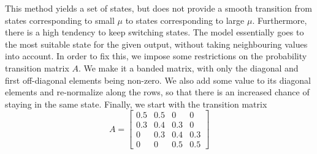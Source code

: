 \documentclass[11pt, twoside]{article}
\begin{document}
This method yields a set of states, but does not provide a smooth transition from states corresponding to small $\mu$ to states corresponding to large $\mu$. Furthermore, there is a high tendency to keep switching states. The model essentially goes to the most suitable state for the given output, without taking neighbouring values into account. In order to fix this, we impose some restrictions on the probability transition matrix $A$. We make it a banded matrix, with only the diagonal and first off-diagonal elements being non-zero. We also add some value to its diagonal elements and re-normalize along the rows, so that there is an increased chance of staying in the same state. Finally, we start with the transition matrix
\begin{equation*}
	A = \left[ \begin{array}{cccc}
	0.5 & 0.5 & 0 & 0 \\
	0.3 & 0.4 & 0.3 & 0 \\
	0 & 0.3 & 0.4 & 0.3 \\
	0 & 0 & 0.5 & 0.5 \end{array} \right]
\end{equation*}
\end{document}
